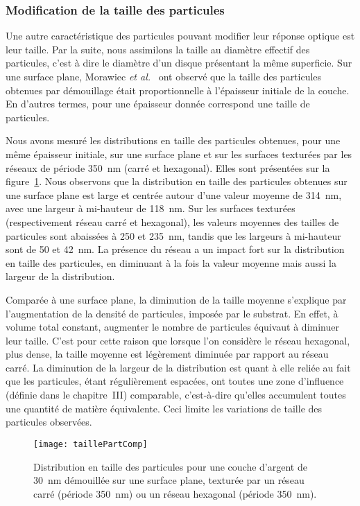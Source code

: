 \subsubsection{Modification de la taille des particules}
Une autre caractéristique des particules pouvant modifier leur réponse optique est leur taille. Par la suite, nous assimilons la \og taille \fg{} au diamètre effectif des particules, c'est à dire le diamètre d'un disque présentant la même superficie. Sur une surface plane, Morawiec \textit{et al.}~\cite{morawiec2013self} ont observé que la taille des particules obtenues par démouillage était proportionnelle à l'épaisseur initiale de la couche. En d'autres termes, pour une épaisseur donnée correspond une taille de particules.\par 
Nous avons mesuré les distributions en taille des particules obtenues, pour une même épaisseur initiale, sur une surface plane et sur les surfaces texturées par les réseaux de période 350~nm (carré et hexagonal). Elles sont présentées sur la figure~\ref{taillePartComp}. Nous observons que la distribution en taille des particules obtenues sur une surface plane est large et centrée autour d'une valeur moyenne de 314~nm, avec une largeur à mi-hauteur de 118~nm. Sur les surfaces texturées (respectivement réseau carré et hexagonal), les valeurs moyennes des tailles de particules sont abaissées à 250 et 235~nm, tandis que les largeurs à mi-hauteur sont de 50 et 42~nm. La présence du réseau a un impact fort sur la distribution en taille des particules, en diminuant à la fois la valeur moyenne mais aussi la largeur de la distribution.\par 
Comparée à une surface plane, la diminution de la taille moyenne s'explique par l'augmentation de la densité de particules, imposée par le substrat. En effet, à volume total constant, augmenter le nombre de particules équivaut à diminuer leur taille. C'est pour cette raison que lorsque l'on considère le réseau hexagonal, plus dense, la taille moyenne est légèrement diminuée par rapport au réseau carré. La diminution de la largeur de la distribution est quant à elle reliée au fait que les particules, étant régulièrement espacées, ont toutes une zone d'influence (définie dans le chapitre~III) comparable, c'est-à-dire qu'elles accumulent toutes une quantité de matière équivalente. Ceci limite les variations de taille des particules observées. \par 
\begin{figure}[!htb]
\centering
\texttt{[image: taillePartComp]}
\caption{Distribution en taille des particules pour une couche d'argent de 30~nm démouillée sur une surface plane, texturée par un réseau carré (période 350~nm) ou un réseau hexagonal (période 350~nm).}
\label{taillePartComp}
\end{figure}

